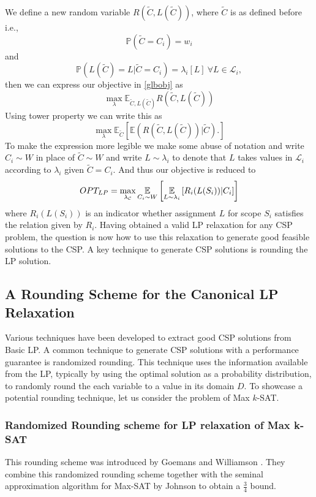 We define a new random variable $R(\tilde{C}, L(\tilde{C}))$, where $\tilde{C}$ is as defined before i.e., 
$$\mathbb{P} (\tilde{C} = C_i ) = w_i$$
and 
$$\mathbb{P}(L(\tilde{C}) = L |\tilde{C}=C_i ) =  \lambda_i[L]\  \forall L \in \mathcal{L}_i,$$ 
then we can express our objective in \ref{glbobj} as 
\begin{equation}
\max_\lambda \mathbb{E}_{\tilde{C}, L(\tilde{C})} R(\tilde{C}, L(\tilde{C}))
\end{equation}
Using tower property we can write this as 
\begin{equation}
\max_\lambda \mathbb{E}_{\tilde{C}} \left[ \mathbb{E} \left(R(\tilde{C}, L(\tilde{C}))\displaystyle|\tilde{C}\right). \right]
\end{equation}
To make the expression more legible we make some abuse of notation and write $C_i \sim W$ in place of $\tilde{C} \sim W$ and write $L \sim \lambda_i$ to denote that $L$ takes values in $\mathcal L_i$ according to $\lambda_i$ given $\tilde{C} = C_i$. And thus our objective is reduced to
\[
	OPT_{LP} = \max_{\lambda_{\mathcal{C}}} \underset{C_i \sim W}{\mathbb{E}} \left[ \underset{L \sim \lambda_{i}}{\mathbb{E}} \left[ R_i( L (S_i )) |C_i \right] \right]
\]
where $R_i( L (S_i ))$ is an indicator whether assignment $L$ for scope $S_i$ satisfies the relation given by $R_i$.
Having obtained a valid LP relaxation for any CSP problem, the question is now how to use this relaxation to generate good feasible solutions to the CSP. 
A key technique to generate CSP solutions is rounding the LP solution.


\subsection{A Rounding Scheme for the Canonical LP Relaxation}
Various techniques have been developed to extract good CSP solutions from Basic LP.
A common technique to generate CSP solutions with a performance guarantee is randomized rounding.
This technique uses the information available from the LP, typically by using the optimal solution as a probability distribution, to randomly round the each variable to a value in its domain $D$.
To showcase a potential rounding technique, let us consider the problem of Max $k$-SAT. 

\subsubsection{Randomized Rounding scheme for LP relaxation of Max k-SAT}\label{sec:lpRoundingSat}
This rounding scheme was introduced by Goemans and Williamson \cite{GoeWil94}. They combine this randomized rounding scheme together with the seminal approximation algorithm for Max-SAT by Johnson \cite{Joh73} to obtain a $\frac{3}{4}$ bound.
 
